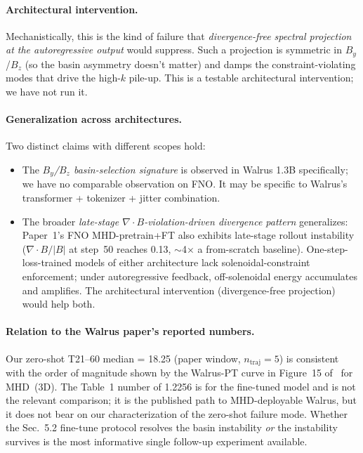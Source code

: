 \documentclass{article}
\begin{document}
\paragraph{Architectural intervention.} Mechanistically, this is the kind of failure that \emph{divergence-free spectral projection at the autoregressive output} would suppress. Such a projection is symmetric in $B_y$/$B_z$ (so the basin asymmetry doesn't matter) and damps the constraint-violating modes that drive the high-$k$ pile-up. This is a testable architectural intervention; we have not run it.

\paragraph{Generalization across architectures.} Two distinct claims with different scopes hold:
\begin{itemize}
  \setlength\itemsep{0.2em}
  \item The \emph{$B_y$/$B_z$ basin-selection signature} is observed in Walrus 1.3B specifically; we have no comparable observation on FNO. It may be specific to Walrus's transformer + tokenizer + jitter combination.
  \item The broader \emph{late-stage $\nabla\cdot B$-violation-driven divergence pattern} generalizes: Paper~1's FNO MHD-pretrain+FT also exhibits late-stage rollout instability ($\nabla\cdot B / |B|$ at step~50 reaches 0.13, $\sim$4$\times$ a from-scratch baseline). One-step-loss-trained models of either architecture lack solenoidal-constraint enforcement; under autoregressive feedback, off-solenoidal energy accumulates and amplifies. The architectural intervention (divergence-free projection) would help both.
\end{itemize}

\paragraph{Relation to the Walrus paper's reported numbers.} Our zero-shot T21--60 median = 18.25 (paper window, $n_{\text{traj}}{=}5$) is consistent with the order of magnitude shown by the Walrus-PT curve in Figure~15 of~\cite{mccabe2025walrus} for MHD~(3D). The Table~1 number of 1.2256 is for the fine-tuned model and is not the relevant comparison; it is the published path to MHD-deployable Walrus, but it does not bear on our characterization of the zero-shot failure mode. Whether the Sec.~5.2 fine-tune protocol resolves the basin instability \emph{or} the instability survives is the most informative single follow-up experiment available.
\end{document}
